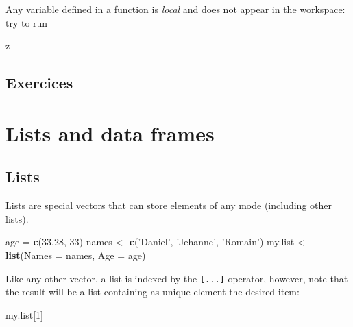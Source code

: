 \documentclass[]{book}
\newenvironment{Shaded}{\begin{snugshade}}{\end{snugshade}}
\newcommand{\DataTypeTok}[1]{\textcolor[rgb]{0.13,0.29,0.53}{#1}}
\newcommand{\DecValTok}[1]{\textcolor[rgb]{0.00,0.00,0.81}{#1}}
\newcommand{\KeywordTok}[1]{\textcolor[rgb]{0.13,0.29,0.53}{\textbf{#1}}}
\newcommand{\NormalTok}[1]{#1}
\newcommand{\StringTok}[1]{\textcolor[rgb]{0.31,0.60,0.02}{#1}}
\begin{document}
Any variable defined in a function is \emph{local} and does not appear in the workspace: try to run

\begin{Shaded}
\begin{Highlighting}[]
\NormalTok{z}
\end{Highlighting}
\end{Shaded}

\hypertarget{exercices}{%
\section{Exercices}\label{exercices}}

\hypertarget{lists-and-data-frames}{%
\chapter{Lists and data frames}\label{lists-and-data-frames}}

\hypertarget{lists}{%
\section{Lists}\label{lists}}

Lists are special vectors that can store elements of any mode (including other lists).

\begin{Shaded}
\begin{Highlighting}[]
\NormalTok{age =}\StringTok{ }\KeywordTok{c}\NormalTok{(}\DecValTok{33}\NormalTok{,}\DecValTok{28}\NormalTok{, }\DecValTok{33}\NormalTok{)}
\NormalTok{names <-}\StringTok{ }\KeywordTok{c}\NormalTok{(}\StringTok{'Daniel'}\NormalTok{, }\StringTok{'Jehanne'}\NormalTok{, }\StringTok{'Romain'}\NormalTok{)}
\NormalTok{my.list <-}\StringTok{ }\KeywordTok{list}\NormalTok{(}\DataTypeTok{Names =}\NormalTok{ names, }\DataTypeTok{Age =}\NormalTok{ age)}
\end{Highlighting}
\end{Shaded}

Like any other vector, a list is indexed by the \texttt{{[}...{]}} operator, however, note that the result will be a list containing as unique element the desired item:

\begin{Shaded}
\begin{Highlighting}[]
\NormalTok{my.list[}\DecValTok{1}\NormalTok{]}
\end{Highlighting}
\end{Shaded}
\end{document}
